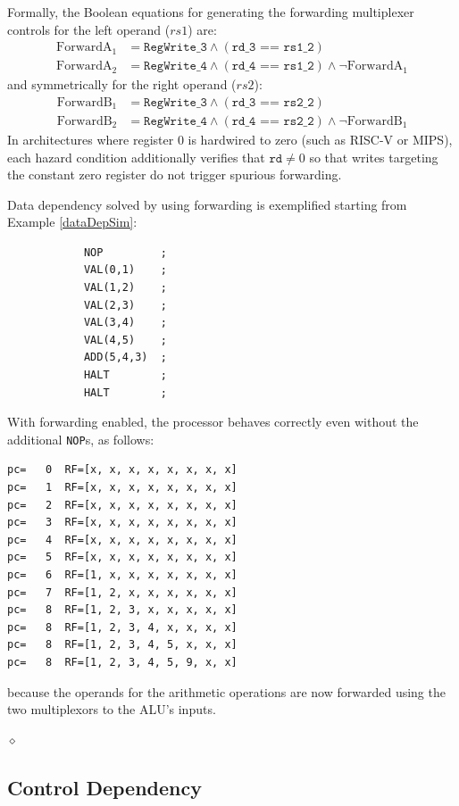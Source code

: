 Formally, the Boolean equations for generating the forwarding multiplexer controls for the left operand ($rs1$) are:
\begin{align}
\text{ForwardA}_{1} &= \texttt{RegWrite\_3} \land (\texttt{rd\_3 == rs1\_2}) \\
\text{ForwardA}_{2} &= \texttt{RegWrite\_4} \land (\texttt{rd\_4 == rs1\_2}) \land \neg \text{ForwardA}_{1}
\end{align}
and symmetrically for the right operand ($rs2$):
\begin{align}
\text{ForwardB}_{1} &= \texttt{RegWrite\_3} \land (\texttt{rd\_3 == rs2\_2}) \\
\text{ForwardB}_{2} &= \texttt{RegWrite\_4} \land (\texttt{rd\_4 == rs2\_2}) \land \neg \text{ForwardB}_{1}
\end{align}
In architectures where register 0 is hardwired to zero (such as RISC-V or MIPS), each hazard condition additionally verifies that $\texttt{rd} \neq 0$ so that writes targeting the constant zero register do not trigger spurious forwarding.

\begin{exemplu}\label{dataDepSimulation}
Data dependency solved by using forwarding is exemplified starting from Example \ref{dataDepSim}:
\begin{verbatim}
            NOP         ;
            VAL(0,1)    ;
            VAL(1,2)    ;
            VAL(2,3)    ;
            VAL(3,4)    ;
            VAL(4,5)    ;
            ADD(5,4,3)  ;
            HALT        ;
            HALT        ;
\end{verbatim}
With forwarding enabled, the processor behaves correctly even without the additional {\tt NOP}s, as follows:
\begin{verbatim}
pc=   0  RF=[x, x, x, x, x, x, x, x]
pc=   1  RF=[x, x, x, x, x, x, x, x]
pc=   2  RF=[x, x, x, x, x, x, x, x]
pc=   3  RF=[x, x, x, x, x, x, x, x]
pc=   4  RF=[x, x, x, x, x, x, x, x]
pc=   5  RF=[x, x, x, x, x, x, x, x]
pc=   6  RF=[1, x, x, x, x, x, x, x]
pc=   7  RF=[1, 2, x, x, x, x, x, x]
pc=   8  RF=[1, 2, 3, x, x, x, x, x]
pc=   8  RF=[1, 2, 3, 4, x, x, x, x]
pc=   8  RF=[1, 2, 3, 4, 5, x, x, x]
pc=   8  RF=[1, 2, 3, 4, 5, 9, x, x]
\end{verbatim}
because the operands for the arithmetic operations are now forwarded  using the two multiplexors to the ALU's inputs.

$\diamond$
\end{exemplu}


\subsection{Control Dependency}

